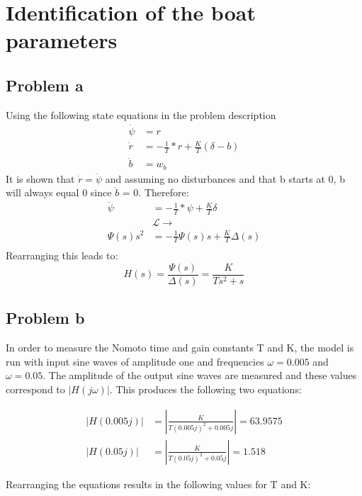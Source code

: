 \section{Identification of the boat parameters}
\subsection{Problem a}
Using the following state equations in the problem description \cite{assignment}
%
\begin{align*}
    \dot{\psi} &= r \\
    \dot{r} &= -\frac{1}{T}*r + \frac{K}{T}(\delta - b) \\
    \dot{b} &= w_b
\end{align*}
%
It is shown that $\dot{r} = \ddot{\psi}$ and assuming no disturbances and that b starts at 0, b will
always equal 0 since $\dot{b}$ = 0. Therefore:
%
\begin{align*}
    \ddot{\psi} &= -\frac{1}{T}*\psi + \frac{K}{T}\delta \\
    &\mathcal{L}\rightarrow  \\
    \Psi(s)s^2  &= -\frac{1}{T}\Psi(s)s + \frac{K}{T}\Delta(s) \\
\end{align*}
%
Rearranging this leads to:
\begin{equation}
\label{eq:rudder to compass transfer function}
    H(s) = \frac{\Psi(s)}{\Delta(s)} = \frac{K}{Ts^2 + s}
\end{equation}

\subsection{Problem b}
In order to measure the Nomoto time and gain constants T and K, the model is run with input sine waves
of amplitude one and frequencies $\omega = 0.005$ and $\omega = 0.05$. The amplitude of the output sine
waves are measured and these values correspond to $\left|H(j\omega)\right|$. This produces the following two
equations:

\begin{align*}
    \left|H(0.005j)\right| &= \left|\frac{K}{T(0.005j)^2 + 0.005j}\right| = 63.9575 \\
    \left|H(0.05j)\right| &= \left|\frac{K}{T(0.05j)^2 + 0.05j}\right| = 1.518
\end{align*}

Rearranging the equations results in the following values for T and K:

